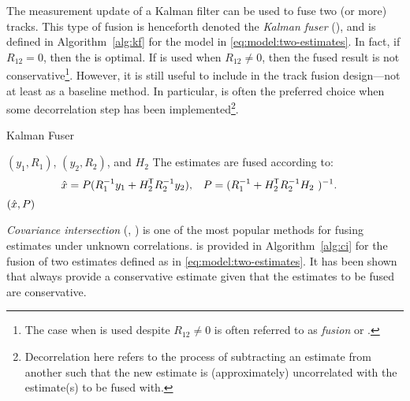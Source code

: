 The measurement update of a Kalman filter can be used to fuse two (or more) tracks. This type of fusion is henceforth denoted the \emph{Kalman fuser} (\abbrKF), and is defined in Algorithm~\ref{alg:kf} for the model in \eqref{eq:model:two-estimates}. In fact, if $R_{12}=0$, then the \abbrKF is optimal. If \abbrKF is used when $R_{12}\neq 0$, then the fused result is not conservative\footnote{The case when \abbrKF is used despite $R_{12}\neq 0$ is often referred to as \emph{\naive fusion} or \emph{\naive \abbrKF}.}. However, it is still useful to include \abbrKF in the track fusion design---not at least as a baseline method. In particular, \abbrKF is often the preferred choice when some decorrelation step has been implemented\footnote{Decorrelation here refers to the process of subtracting an estimate from another such that the new estimate is (approximately) uncorrelated with the estimate(s) to be fused with.}.

\begin{algorithm}[tb]
	\caption{Kalman Fuser}
	\label{alg:kf}
	\begin{small}
	\begin{algorithmic}[0]
		\Input $(y_1,R_1)$, $(y_2,R_2)$, and $H_2$
		\State The estimates are fused according to:
		\begin{align} 
			\xhat &= P(R_1\inv y_1 + H_2\trnsp R_2\inv y_2), & P &= (R_1\inv + H_2\trnsp R_2\inv H_2 )\inv.
			\label{eq:method:kalman-fuser-2est}
		\end{align}
		\Output $(\hat{x},P)$
	\end{algorithmic}
	\end{small}
\end{algorithm}



\emph{Covariance intersection} (\abbrCI, \cite{Julier1997ACC}) is one of the most popular methods for fusing estimates under unknown correlations. \abbrCI is provided in Algorithm~\ref{alg:ci} for the fusion of two estimates defined as in \eqref{eq:model:two-estimates}. It has been shown that \abbrCI always provide a conservative estimate given that the estimates to be fused are conservative.

